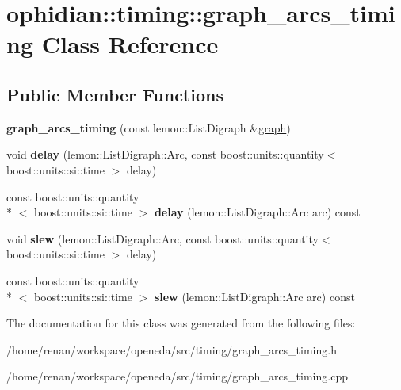 \hypertarget{classophidian_1_1timing_1_1graph__arcs__timing}{\section{ophidian\-:\-:timing\-:\-:graph\-\_\-arcs\-\_\-timing Class Reference}
\label{classophidian_1_1timing_1_1graph__arcs__timing}
}
\subsection*{Public Member Functions}
\begin{DoxyCompactItemize}
\item 
\hypertarget{classophidian_1_1timing_1_1graph__arcs__timing_a8957dab8866bcc96d270d9c5b5d341b9}{{\bfseries graph\-\_\-arcs\-\_\-timing} (const lemon\-::\-List\-Digraph \&\hyperlink{classophidian_1_1timing_1_1graph}{graph})}\label{classophidian_1_1timing_1_1graph__arcs__timing_a8957dab8866bcc96d270d9c5b5d341b9}

\item 
\hypertarget{classophidian_1_1timing_1_1graph__arcs__timing_ac6e7c463997b5196e9f406bf33735e0a}{void {\bfseries delay} (lemon\-::\-List\-Digraph\-::\-Arc, const boost\-::units\-::quantity$<$ boost\-::units\-::si\-::time $>$ delay)}\label{classophidian_1_1timing_1_1graph__arcs__timing_ac6e7c463997b5196e9f406bf33735e0a}

\item 
\hypertarget{classophidian_1_1timing_1_1graph__arcs__timing_a26ea9fcad7051f9ecb33071046bb591b}{const boost\-::units\-::quantity\\*
$<$ boost\-::units\-::si\-::time $>$ {\bfseries delay} (lemon\-::\-List\-Digraph\-::\-Arc arc) const }\label{classophidian_1_1timing_1_1graph__arcs__timing_a26ea9fcad7051f9ecb33071046bb591b}

\item 
\hypertarget{classophidian_1_1timing_1_1graph__arcs__timing_a3dc923c0f62f227c07f476b3aea6391f}{void {\bfseries slew} (lemon\-::\-List\-Digraph\-::\-Arc, const boost\-::units\-::quantity$<$ boost\-::units\-::si\-::time $>$ delay)}\label{classophidian_1_1timing_1_1graph__arcs__timing_a3dc923c0f62f227c07f476b3aea6391f}

\item 
\hypertarget{classophidian_1_1timing_1_1graph__arcs__timing_afbc3ecdade4fe977321b9372b4f1933b}{const boost\-::units\-::quantity\\*
$<$ boost\-::units\-::si\-::time $>$ {\bfseries slew} (lemon\-::\-List\-Digraph\-::\-Arc arc) const }\label{classophidian_1_1timing_1_1graph__arcs__timing_afbc3ecdade4fe977321b9372b4f1933b}

\end{DoxyCompactItemize}


The documentation for this class was generated from the following files\-:\begin{DoxyCompactItemize}
\item 
/home/renan/workspace/openeda/src/timing/graph\-\_\-arcs\-\_\-timing.\-h\item 
/home/renan/workspace/openeda/src/timing/graph\-\_\-arcs\-\_\-timing.\-cpp\end{DoxyCompactItemize}

